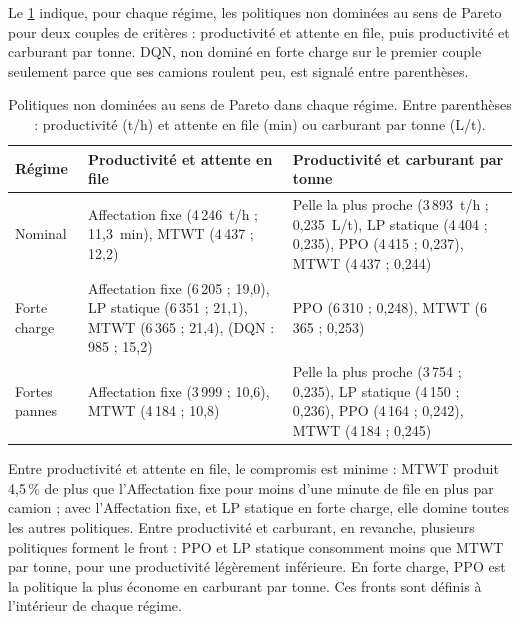 \documentclass[11pt,a4paper]{article}
\newif\ifrevmarks
\newcommand{\revtag}[1]{\ifrevmarks\textsuperscript{\textcolor{red!70!black}{\scriptsize[#1]}}\fi}
\newenvironment{revbloc}[1]{\par\ifrevmarks\color{revcolor}\noindent\revtag{#1}\ \fi}{\par}
\newif\ifcorrmarks
\newcommand{\corr}[1]{\ifcorrmarks\textcolor{corrcolor}{#1}\else#1\fi}
\begin{document}
\begin{revbloc}{T31}
Le \cref{tab:pareto} indique, pour chaque régime, les politiques non dominées au sens de Pareto pour deux couples de critères : productivité et attente en file, puis productivité et carburant par tonne. DQN, non dominé en forte charge sur le premier couple seulement parce que ses camions roulent peu, est signalé entre parenthèses.

\begin{table}[H]
\centering
\caption{Politiques non dominées au sens de Pareto dans chaque régime. Entre parenthèses : productivité (t/h) et attente en file (min) ou carburant par tonne (L/t).}
\label{tab:pareto}
\small
\begin{tabularx}{\textwidth}{l>{\raggedright\arraybackslash}X>{\raggedright\arraybackslash}X}
\toprule
\textbf{Régime} & \textbf{Productivité et attente en file} & \textbf{Productivité et carburant par tonne} \\
\midrule
Nominal & Affectation fixe (4\,246~t/h ; 11,3~min), MTWT (4\,437 ; 12,2) & Pelle la plus proche (3\,893~t/h ; 0,235~L/t), \corr{LP statique} (4\,404 ; 0,235), PPO (4\,415 ; 0,237), MTWT (4\,437 ; 0,244) \\
Forte charge & Affectation fixe (6\,205 ; 19,0), \corr{LP statique} (6\,351 ; 21,1), MTWT (6\,365 ; 21,4), (DQN : 985 ; 15,2) & PPO (6\,310 ; 0,248), MTWT (6\,365 ; 0,253) \\
Fortes pannes & Affectation fixe (3\,999 ; 10,6), MTWT (4\,184 ; 10,8) & Pelle la plus proche (3\,754 ; 0,235), \corr{LP statique} (4\,150 ; 0,236), PPO (4\,164 ; 0,242), MTWT (4\,184 ; 0,245) \\
\bottomrule
\end{tabularx}
\end{table}

Entre productivité et attente en file, le compromis est minime : MTWT produit 4,5\,\% de plus que l'Affectation fixe pour moins d'une minute de file en plus par camion ; avec l'Affectation fixe, et \corr{LP statique} en forte charge, elle domine toutes les autres politiques. Entre productivité et carburant, en revanche, plusieurs politiques forment le front : PPO et \corr{LP statique} consomment moins que MTWT par tonne, pour une productivité légèrement inférieure. En forte charge, PPO est la politique la plus économe en carburant par tonne. Ces fronts sont définis à l'intérieur de chaque régime.


\end{revbloc}
\end{document}
